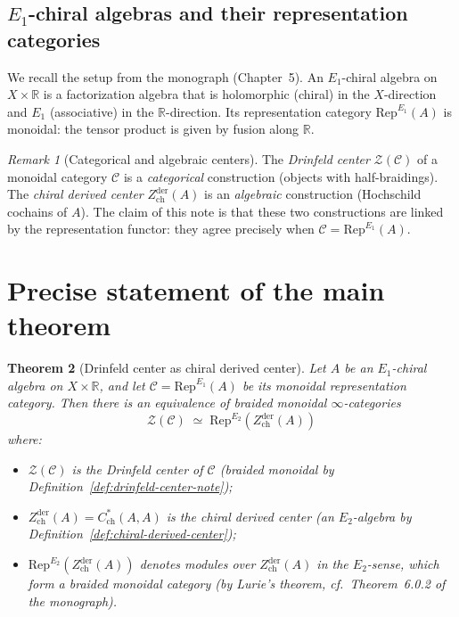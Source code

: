 \documentclass[11pt]{article}
\newtheorem{theorem}{Theorem}[section]
\theoremstyle{definition}
\theoremstyle{remark}
\newtheorem{remark}[theorem]{Remark}
\newcommand{\Rep}{\mathrm{Rep}}
\newcommand{\cC}{\mathcal{C}}
\newcommand{\cZ}{\mathcal{Z}}
\newcommand{\Zder}{Z^{\mathrm{der}}_{\mathrm{ch}}}
\begin{document}
\subsection{$E_1$-chiral algebras and their representation categories}

We recall the setup from the monograph (Chapter~5). An $E_1$-chiral algebra on $X \times \mathbb{R}$ is a factorization algebra that is holomorphic (chiral) in the $X$-direction and $E_1$ (associative) in the $\mathbb{R}$-direction. Its representation category $\Rep^{E_1}(A)$ is monoidal: the tensor product is given by fusion along $\mathbb{R}$.

\begin{remark}[Categorical and algebraic centers]
\label{rem:centers-distinct}
The \emph{Drinfeld center} $\cZ(\cC)$ of a monoidal category $\cC$ is a \emph{categorical} construction (objects with half-braidings). The \emph{chiral derived center} $\Zder(A)$ is an \emph{algebraic} construction (Hochschild cochains of $A$). The claim of this note is that these two constructions are linked by the representation functor: they agree precisely when $\cC = \Rep^{E_1}(A)$.
\end{remark}


\section{Precise statement of the main theorem}
\label{sec:main-theorem}

\begin{theorem}[Drinfeld center as chiral derived center]
\label{thm:drinfeld-chiral-center}
Let $A$ be an $E_1$-chiral algebra on $X \times \mathbb{R}$, and let $\cC = \Rep^{E_1}(A)$ be its monoidal representation category. Then there is an equivalence of braided monoidal $\infty$-categories
\begin{equation}
\label{eq:main-equivalence}
 \cZ(\cC) \;\simeq\; \Rep^{E_2}(\Zder(A))
\end{equation}
where:
\begin{itemize}
 \item $\cZ(\cC)$ is the Drinfeld center of $\cC$ (braided monoidal by Definition~\ref{def:drinfeld-center-note});
 \item $\Zder(A) = C^*_{\mathrm{ch}}(A,A)$ is the chiral derived center (an $E_2$-algebra by Definition~\ref{def:chiral-derived-center});
 \item $\Rep^{E_2}(\Zder(A))$ denotes modules over $\Zder(A)$ in the $E_2$-sense, which form a braided monoidal category (by Lurie's theorem, cf.\ Theorem~6.0.2 of the monograph).
\end{itemize}
\end{theorem}
\end{document}
